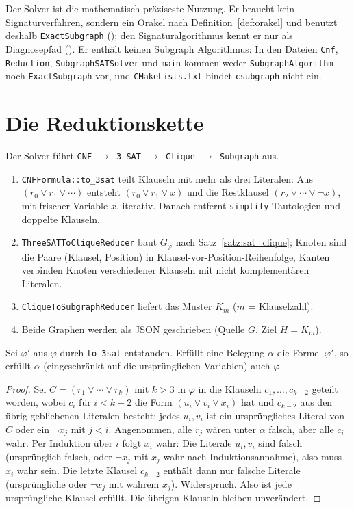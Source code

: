 Der Solver ist die mathematisch präziseste Nutzung. Er braucht kein Signaturverfahren, sondern ein Orakel nach Definition~\ref{def:orakel} und benutzt deshalb \texttt{ExactSubgraph} (); den Signaturalgorithmus kennt er nur als Diagnosepfad (). Er enthält keinen Subgraph Algorithmus: In den Dateien \texttt{Cnf}, \texttt{Reduction}, \texttt{SubgraphSATSolver} und \texttt{main} kommen weder \texttt{SubgraphAlgorithm} noch \texttt{ExactSubgraph} vor, und \texttt{CMakeLists.txt} bindet \texttt{csubgraph} nicht ein.

\section{Die Reduktionskette}
\label{sec:solver_kette}

Der Solver führt \texttt{CNF $\to$ 3-SAT $\to$ Clique $\to$ Subgraph} aus.

\begin{enumerate}
	\item \texttt{CNFFormula::to\_3sat} teilt Klauseln mit mehr als drei Literalen: Aus $(r_0\vee r_1\vee\cdots)$ entsteht $(r_0\vee r_1\vee x)$ und die Restklausel $(r_2\vee\cdots\vee\neg x)$, mit frischer Variable $x$, iterativ. Danach entfernt \texttt{simplify} Tautologien und doppelte Klauseln.
	\item \texttt{ThreeSATToCliqueReducer} baut $G_\varphi$ nach Satz~\ref{satz:sat_clique}; Knoten sind die Paare (Klausel, Position) in Klausel-vor-Position-Reihenfolge, Kanten verbinden Knoten verschiedener Klauseln mit nicht komplementären Literalen.
	\item \texttt{CliqueToSubgraphReducer} liefert das Muster $K_m$ ($m$ = Klauselzahl).
	\item Beide Graphen werden als JSON geschrieben (Quelle $G$, Ziel $H=K_m$).
\end{enumerate}

\begin{lemma}[Klauselteilung]
	\label{lem:teilung}
	Sei $\varphi'$ aus $\varphi$ durch \texttt{to\_3sat} entstanden. Erfüllt eine Belegung $\alpha$ die Formel $\varphi'$, so erfüllt $\alpha$ (eingeschränkt auf die ursprünglichen Variablen) auch $\varphi$.
\end{lemma}

\begin{proof}
	Sei $C=(r_1\vee\cdots\vee r_k)$ mit $k>3$ in $\varphi$ in die Klauseln $c_1,\ldots,c_{k-2}$ geteilt worden, wobei $c_i$ für $i<k-2$ die Form $(u_i\vee v_i\vee x_i)$ hat und $c_{k-2}$ aus den übrig gebliebenen Literalen besteht; jedes $u_i,v_i$ ist ein ursprüngliches Literal von $C$ oder ein $\neg x_j$ mit $j<i$. Angenommen, alle $r_j$ wären unter $\alpha$ falsch, aber alle $c_i$ wahr. Per Induktion über $i$ folgt $x_i$ wahr: Die Literale $u_i,v_i$ sind falsch (ursprünglich falsch, oder $\neg x_j$ mit $x_j$ wahr nach Induktionsannahme), also muss $x_i$ wahr sein. Die letzte Klausel $c_{k-2}$ enthält dann nur falsche Literale (ursprüngliche oder $\neg x_j$ mit wahrem $x_j$). Widerspruch. Also ist jede ursprüngliche Klausel erfüllt. Die übrigen Klauseln bleiben unverändert.
\end{proof}

